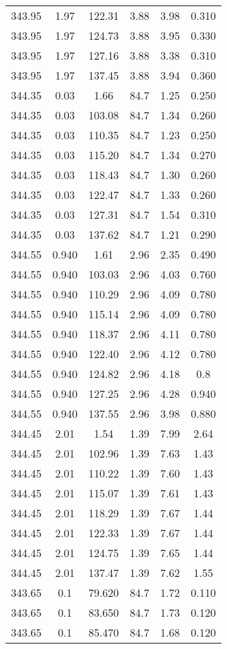 \begin{longtable}{||c|c|c|c|c|c||}
343.95	&1.97	&122.31	&3.88	&3.98	&0.310\\
343.95	&1.97	&124.73	&3.88	&3.95	&0.330\\
343.95	&1.97	&127.16	&3.88	&3.38	&0.310\\
343.95	&1.97	&137.45	&3.88	&3.94	&0.360\\
344.35	&0.03	&1.66	&84.7	&1.25	&0.250\\
344.35	&0.03	&103.08	&84.7	&1.34	&0.260\\
344.35	&0.03	&110.35	&84.7	&1.23	&0.250\\
344.35	&0.03	&115.20	&84.7	&1.34	&0.270\\
344.35	&0.03	&118.43	&84.7	&1.30	&0.260\\
344.35	&0.03	&122.47	&84.7	&1.33	&0.260\\
344.35	&0.03	&127.31	&84.7	&1.54	&0.310\\
344.35	&0.03	&137.62	&84.7	&1.21	&0.290\\
344.55	&0.940	&1.61	&2.96	&2.35	&0.490\\
344.55	&0.940	&103.03	&2.96	&4.03	&0.760\\
344.55	&0.940	&110.29	&2.96	&4.09	&0.780\\
344.55	&0.940	&115.14	&2.96	&4.09	&0.780\\
344.55	&0.940	&118.37	&2.96	&4.11	&0.780\\
344.55	&0.940	&122.40	&2.96	&4.12	&0.780\\
344.55	&0.940	&124.82	&2.96	&4.18	&0.8\\
344.55	&0.940	&127.25	&2.96	&4.28	&0.940\\
344.55	&0.940	&137.55	&2.96	&3.98	&0.880\\
344.45	&2.01	&1.54	&1.39	&7.99	&2.64\\
344.45	&2.01	&102.96	&1.39	&7.63	&1.43\\
344.45	&2.01	&110.22	&1.39	&7.60	&1.43\\
344.45	&2.01	&115.07	&1.39	&7.61	&1.43\\
344.45	&2.01	&118.29	&1.39	&7.67	&1.44\\
344.45	&2.01	&122.33	&1.39	&7.67	&1.44\\
344.45	&2.01	&124.75	&1.39	&7.65	&1.44\\
344.45	&2.01	&137.47	&1.39	&7.62	&1.55\\
343.65	&0.1	&79.620	&84.7	&1.72	&0.110\\
343.65	&0.1	&83.650	&84.7	&1.73	&0.120\\
343.65	&0.1	&85.470	&84.7	&1.68	&0.120\\

\end{longtable}
